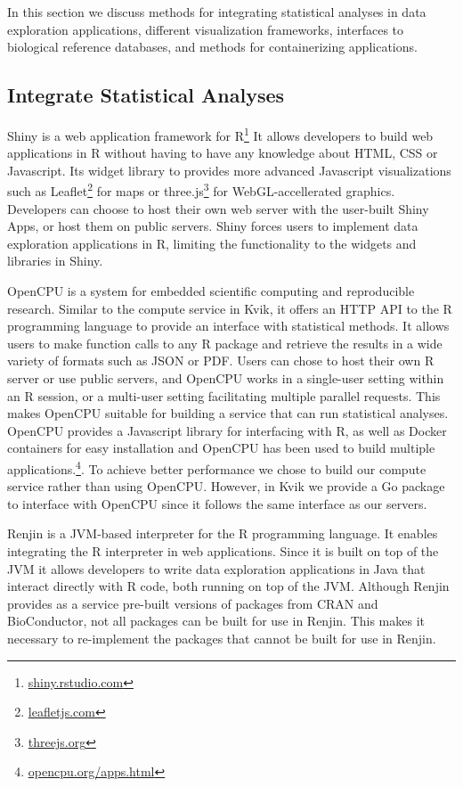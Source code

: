 In this section we discuss methods for integrating statistical analyses in data
exploration applications, different visualization frameworks, interfaces to
biological reference databases, and methods for containerizing applications. 

\subsection*{Integrate Statistical Analyses} 
Shiny is a web application framework for R\footnote{\url{shiny.rstudio.com}}
It allows developers to build web applications in R without having to have any
knowledge about HTML, CSS or Javascript. 
Its widget library to provides more advanced Javascript
visualizations such as Leaflet\footnote{\url{leafletjs.com}} for maps or
three.js\footnote{\url{threejs.org}} for WebGL-accellerated
graphics. Developers can choose to host their own web server with the user-built
Shiny Apps, or host them on public servers. Shiny forces users to implement data
exploration applications in R, limiting the functionality to the 
widgets and libraries in Shiny. 

OpenCPU is a system for embedded scientific computing and reproducible
research.\cite{opencpu} Similar to the compute service in Kvik, it offers an
HTTP API to the R programming language to provide an interface with statistical
methods. It allows users to make function calls to any R package and retrieve
the results in a wide variety of formats such as JSON or PDF. 
Users can chose to host their own R server or use public servers, and OpenCPU
works in a single-user setting within an R session, or a multi-user setting
facilitating multiple parallel requests. This makes OpenCPU suitable
for building a service that can run statistical analyses. 
OpenCPU provides a Javascript library for interfacing with R, as well as Docker
containers for easy installation and OpenCPU has been used to build multiple
applications.\footnote{\url{opencpu.org/apps.html}}. To achieve better
performance we chose to build our compute service rather than using OpenCPU.
However, in Kvik we provide a Go package to interface with OpenCPU since it
follows the same interface as our servers. 

Renjin is a JVM-based interpreter for the R programming language.\cite{renjin}
It enables integrating the R interpreter in web applications. Since it is built
on top of the JVM it allows developers to write data exploration applications in
Java that interact directly with R code, both running on top of the JVM.
Although Renjin provides as a service pre-built versions of packages from
CRAN and BioConductor, not all packages can be built for use in Renjin. This
makes it necessary to re-implement the packages that cannot be built for use in
Renjin. 

